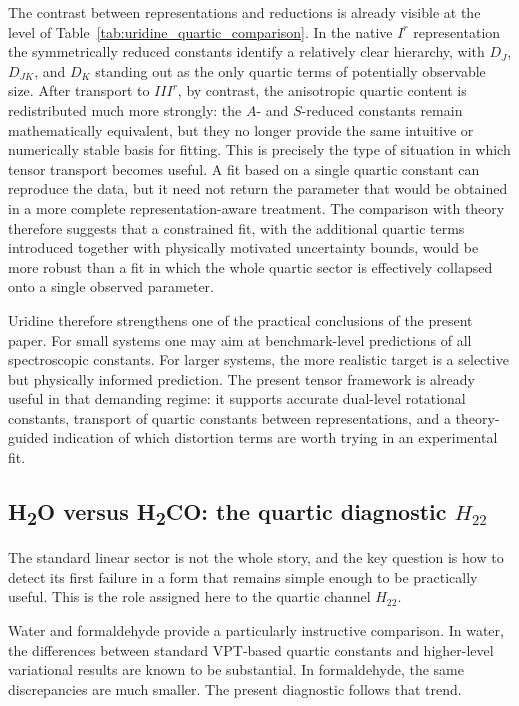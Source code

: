 \documentclass[journal=jacsat,manuscript=article]{achemso}
\begin{document}
The contrast between representations and reductions is already visible at the
level of Table~\ref{tab:uridine_quartic_comparison}. In the native $I^r$
representation the symmetrically reduced constants identify a relatively clear
hierarchy, with $D_J$, $D_{JK}$, and $D_K$ standing out as the only quartic
terms of potentially observable size. After transport to $III^r$, by
contrast, the anisotropic quartic content is redistributed much more strongly:
the $A$- and $S$-reduced constants remain mathematically equivalent, but they
no longer provide the same intuitive or numerically stable basis for fitting.
This is precisely the type of situation in which tensor transport becomes
useful. A fit based on a single quartic constant can reproduce the data, but
it need not return the parameter that would be obtained in a more complete
representation-aware treatment. The comparison with theory therefore suggests
that a constrained fit, with the additional quartic terms introduced together
with physically motivated uncertainty bounds, would be more robust than a fit
in which the whole quartic sector is effectively collapsed onto a single
observed parameter.

Uridine therefore strengthens one of the practical conclusions of the present
paper. For small systems one may aim at benchmark-level predictions of all
spectroscopic constants. For larger systems, the more realistic target is a
selective but physically informed prediction. The present tensor framework is
already useful in that demanding regime: it supports accurate dual-level
rotational constants, transport of quartic constants between representations,
and a theory-guided indication of which distortion terms are worth trying in
an experimental fit.

\subsection{H\textsubscript{2}O versus H\textsubscript{2}CO: the quartic diagnostic \texorpdfstring{$H_{22}$}{H22}}

The standard linear sector is not the whole story, and the key question is how
to detect its first failure in a form that remains simple enough to be
practically useful. This is the role assigned here to the quartic channel
$H_{22}$.

Water and formaldehyde provide a particularly instructive comparison. In
water, the differences between standard VPT-based quartic constants and
higher-level variational results are known to be substantial. In
formaldehyde, the same discrepancies are much smaller. The present diagnostic
follows that trend.
\end{document}
